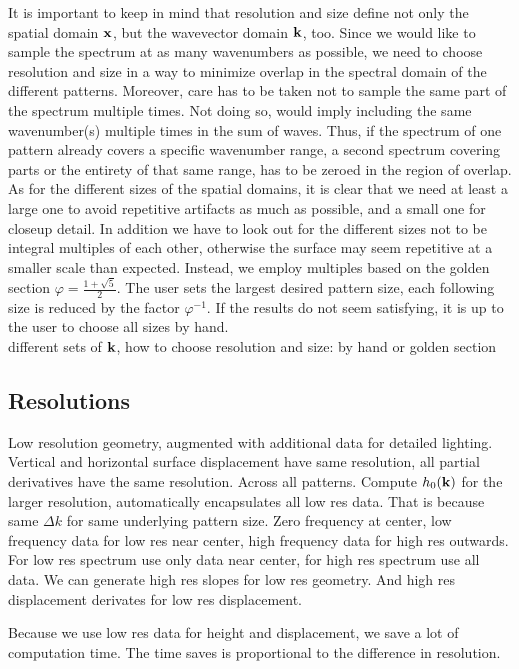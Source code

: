 %
It is important to keep in mind that resolution and size define not only the
spatial domain $\mathbf{x}$, but the wavevector domain $\mathbf{k}$, too. Since we
would like to sample the spectrum at as many wavenumbers as possible, we need to
choose resolution and size in a way to minimize overlap in the spectral domain
of the different patterns. Moreover, care has to be taken not to sample the same
part of the spectrum multiple times. Not doing so, would imply including the
same wavenumber(s) multiple times in the sum of waves. Thus, if the spectrum
of one pattern already covers a specific wavenumber range, a second spectrum
covering parts or the entirety of that same range, has to be zeroed in the
region of overlap. As for the different sizes of the spatial domains, it is
clear that we need at least a large one to avoid repetitive artifacts as much as
possible, and a small one for closeup detail. In addition we have to look out
for the different sizes not to be integral multiples of each other, otherwise
the surface may seem repetitive at a smaller scale than expected. Instead, we
employ multiples based on the golden section $\varphi = \frac{1 + \sqrt{5}}{2}$.
The user sets the largest desired pattern size, each following size is reduced
by the factor $\varphi^{-1}$. If the results do not seem satisfying, it is up to
the user to choose all sizes by hand.\\




different sets of $\mathbf{k}$, how to choose resolution and size: by hand or 
golden section


\subsection{Resolutions}
Low resolution geometry, augmented with additional data for detailed lighting.
Vertical and horizontal surface displacement have same resolution, all partial
derivatives have the same resolution. Across all patterns.
Compute $h_0(\mathbf{k})$ for the larger resolution, automatically encapsulates
all low res data. That is because same $\Delta k$ for same underlying pattern
size. Zero frequency at center, low frequency data for low res near center,
high frequency data for high res outwards. For low res spectrum use only data
near center, for high res spectrum use all data. We can generate high res slopes
for low res geometry. And high res displacement derivates for low res
displacement.

Because we use low res data for height and displacement, we save a lot of
computation time. The time saves is proportional to the difference in
resolution.


